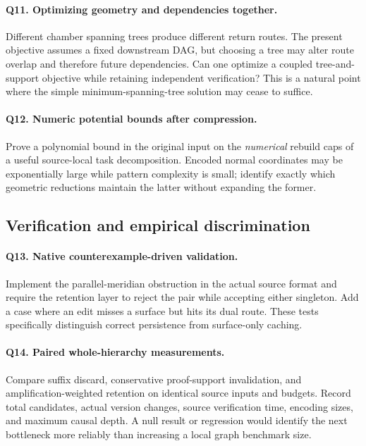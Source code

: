 \documentclass[11pt]{article}
\theoremstyle{definition}
\begin{document}
\paragraph{Q11. Optimizing geometry and dependencies together.}
Different chamber spanning trees produce different return routes. The present objective assumes a fixed downstream DAG, but choosing a tree may alter route overlap and therefore future dependencies. Can one optimize a coupled tree-and-support objective while retaining independent verification? This is a natural point where the simple minimum-spanning-tree solution may cease to suffice.

\paragraph{Q12. Numeric potential bounds after compression.}
Prove a polynomial bound in the original input on the \emph{numerical} rebuild caps of a useful source-local task decomposition. Encoded normal coordinates may be exponentially large while pattern complexity is small; identify exactly which geometric reductions maintain the latter without expanding the former.

\subsection{Verification and empirical discrimination}
\paragraph{Q13. Native counterexample-driven validation.}
Implement the parallel-meridian obstruction in the actual source format and require the retention layer to reject the pair while accepting either singleton. Add a case where an edit misses a surface but hits its dual route. These tests specifically distinguish correct persistence from surface-only caching.

\paragraph{Q14. Paired whole-hierarchy measurements.}
Compare suffix discard, conservative proof-support invalidation, and amplification-weighted retention on identical source inputs and budgets. Record total candidates, actual version changes, source verification time, encoding sizes, and maximum causal depth. A null result or regression would identify the next bottleneck more reliably than increasing a local graph benchmark size.
\end{document}

